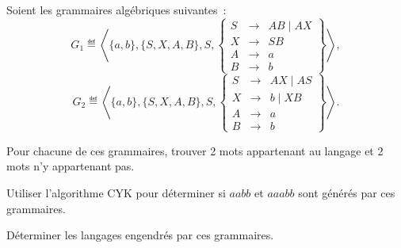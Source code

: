 
\begingroup

\begin{exercice}\label{exo:parsing/decision/CYK}

  Soient les grammaires algébriques suivantes~:
  $$G_1\eqdef\left\langle \{a, b\}, \{S, X, A, B\}, S,
    \left\{\begin{array}{lll}
    S   &\rightarrow& AB \mid  AX\\
    X   &\rightarrow& SB \\
    A   &\rightarrow& a \\
    B   &\rightarrow& b
    \end{array}\right\}\right\rangle,$$
    $$G_2\eqdef\left\langle\{a, b\}, \{S, X, A, B\}, S,
    \left\{\begin{array}{lllllll}
    S   &\rightarrow& AX \mid  AS\\
    X   &\rightarrow& b \mid  XB\\
    A   &\rightarrow& a \\
    B   &\rightarrow& b
    \end{array}\right\}\right\rangle.$$

  \begin{questions}
  \item Pour chacune de ces grammaires, trouver 2 mots appartenant au langage et 2 mots n'y appartenant pas.
  \item Utiliser l'algorithme CYK pour déterminer si $aabb$ et $aaabb$ sont générés par ces grammaires.
  \item Déterminer les langages engendrés par ces grammaires.
  \end{questions}

\end{exercice}

